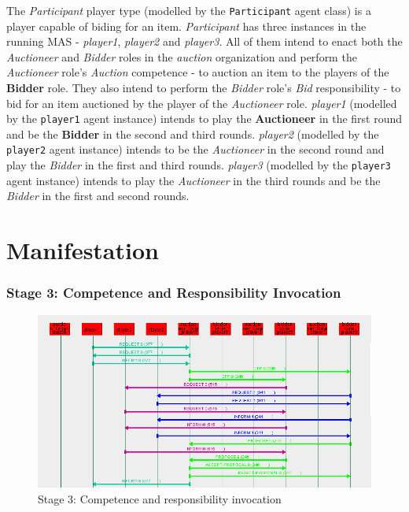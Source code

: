 The \textit{Participant} player type (modelled by the \texttt{Participant} agent class) is a player capable of biding for an item.
\textit{Participant} has three instances in the running MAS - \textit{player1}, \textit{player2} and \textit{player3}.
All of them intend to enact both the \textit{Auctioneer} and \textit{Bidder} roles in the \textit{auction} organization and perform the \textit{Auctioneer} role's \textit{Auction} competence - to auction an item to the players of the \textbf{Bidder} role.
They also intend to perform the \textit{Bidder} role's \textit{Bid} responsibility - to bid for an item auctioned by the player of the \textit{Auctioneer} role.
\textit{player1} (modelled by the \texttt{player1} agent instance) intends to play the \textbf{Auctioneer} in the first round and be the \textbf{Bidder} in the second and third rounds.
\textit{player2} (modelled by the \texttt{player2} agent instance) intends to be the \textit{Auctioneer} in the second round and play the \textit{Bidder} in the first and third rounds.
\textit{player3} (modelled by the \texttt{player3} agent instance) intends to play the \textit{Auctioneer} in the third rounds and be the \textit{Bidder} in the first and second rounds.

\section{Manifestation} 

\subsubsection*{Stage 3: Competence and Responsibility Invocation}

\begin{figure}[H]
	\centering
	\includegraphics[width=\textwidth]{images/example3-stageA3.png}
	\caption{Stage 3: Competence and responsibility invocation}
	\label{figure:example3-stageA3}
\end{figure}

